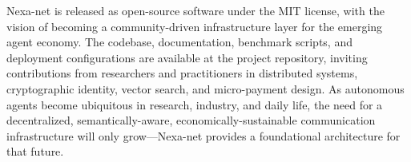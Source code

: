 Nexa-net is released as open-source software under the MIT license, with the vision of becoming a community-driven infrastructure layer for the emerging agent economy. The codebase, documentation, benchmark scripts, and deployment configurations are available at the project repository, inviting contributions from researchers and practitioners in distributed systems, cryptographic identity, vector search, and micro-payment design. As autonomous agents become ubiquitous in research, industry, and daily life, the need for a decentralized, semantically-aware, economically-sustainable communication infrastructure will only grow---Nexa-net provides a foundational architecture for that future.